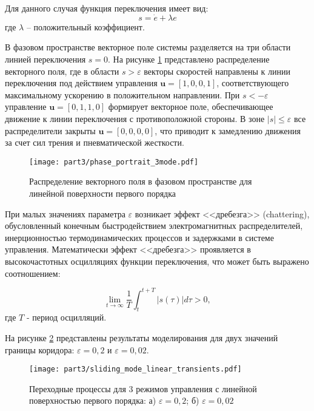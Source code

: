 Для данного случая функция переключения имеет вид:
\begin{equation*}
	s = \dot{e} + \lambda e
\end{equation*}
где $\lambda$ -- положительный коэффициент.

В фазовом пространстве векторное поле системы разделяется на три области линией
переключения $s = 0$. На рисунке \ref{fig:vector_field_linear} представлено
распределение векторного поля, где в области $s > \varepsilon$ векторы
скоростей направлены к линии переключения под действием
управления $\mathbf{u} = [1,0,0,1]$, соответствующего максимальному ускорению в положительном
направлении. При $s < -\varepsilon$ управление $\mathbf{u} = [0,1,1,0]$ формирует
векторное поле, обеспечивающее движение к линии переключения с противоположной
стороны. В зоне $|s| \leq \varepsilon$ все распределители закрыты $\mathbf{u} = [0,0,0,0]$,
что приводит к замедлению движения за счет сил трения и пневматической жесткости.
\begin{figure}[h]
	\centering
	\texttt{[image: part3/phase\_portrait\_3mode.pdf]}
	\caption{Распределение векторного поля в фазовом пространстве для линейной поверхности первого порядка}
	\label{fig:vector_field_linear}
\end{figure}

При малых значениях параметра $\varepsilon$ возникает эффект <<дребезга>> (chattering),
обусловленный конечным быстродействием электромагнитных распределителей,
инерционностью термодинамических процессов и задержками в системе управления.
Математически эффект <<дребезга>> проявляется в высокочастотных осцилляциях функции
переключения, что может быть выражено соотношением:

\begin{equation*}
	\lim_{t \to \infty} \frac{1}{T}\int_t^{t+T} |s(\tau)| d\tau > 0,
\end{equation*}
где $T$ - период осцилляций.

На рисунке \ref{fig:ch3:transient_comparison_linear_mode3} представлены результаты моделирования
для двух значений границы коридора: $\varepsilon = 0,2$ и $\varepsilon = 0,02$.

\begin{figure}[h]
	\centering
	\texttt{[image: part3/sliding\_mode\_linear\_transients.pdf]}
	\caption{Переходные процессы для 3 режимов управления с линейной поверхностью первого порядка:
		а) $\varepsilon = 0,2$; б) $\varepsilon = 0,02$}
	\label{fig:ch3:transient_comparison_linear_mode3}
\end{figure}

